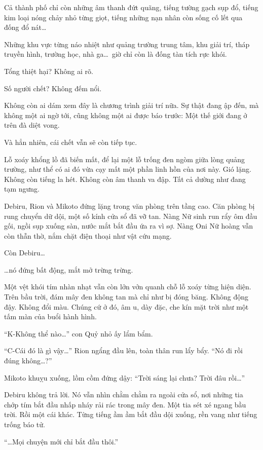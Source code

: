 \documentclass[../main.tex]{subfiles}
\begin{document}
Cả thành phố chỉ còn những âm thanh đứt quãng, tiếng tường gạch sụp đổ, tiếng kim loại nóng chảy nhỏ từng giọt, tiếng những nạn nhân còn sống cố lết qua đống đổ nát\dots

Những khu vực từng náo nhiệt như quảng trường trung tâm, khu giải trí, tháp truyền hình, trường học, nhà ga\dots\ giờ chỉ còn là đống tàn tích rực khói.

Tổng thiệt hại? Không ai rõ.

Số người chết? Không đếm nổi.

Không còn ai dám xem đây là chương trình giải trí nữa. Sự thật đang ập đến, mà không một ai ngờ tới, cũng không một ai được báo trước: Một thế giới đang ở trên đà diệt vong.

Và hẳn nhiên, cái chết vẫn sẽ còn tiếp tục.

\ct

Lỗ xoáy khổng lồ đã biến mất, để lại một lỗ trống đen ngòm giữa lòng quảng trường, như thể có ai đó vừa cạy mất một phần linh hồn của nơi này. Gió lặng. Không còn tiếng la hét. Không còn âm thanh va đập. Tất cả dường như đang tạm ngưng.

Debiru, Rion và Mikoto đứng lặng trong văn phòng trên tầng cao. Căn phòng bị rung chuyển dữ dội, một số kính cửa sổ đã vỡ tan. Nàng Nữ sinh run rẩy ôm đầu gối, ngồi sụp xuống sàn, nước mắt bắt đầu ứa ra vì sợ. Nàng Oni Nữ hoàng vẫn còn thẫn thờ, nắm chặt điện thoại như vật cứu mạng.

Còn Debiru\dots

\dots nó đứng bất động, mắt mở trừng trừng.

Một vệt khói tím nhàn nhạt vẫn còn lởn vởn quanh chỗ lỗ xoáy từng hiện diện. Trên bầu trời, đám mây đen không tan mà chỉ như bị đóng băng. Không động đậy. Không đổi màu. Chúng cứ ở đó, âm u, dày đặc, che kín mặt trời như một tấm màn của buổi hành hình.

``K-Không thể nào\dots'' con Quỷ nhỏ ấy lẩm bẩm.

``C-Cái đó là gì vậy\dots'' Rion ngẩng đầu lên, toàn thân run lẩy bẩy. ``Nó đi rồi đúng không\dots?''

Mikoto khuỵu xuống, lồm cồm đứng dậy: ``Trời sáng lại chưa? Trời đâu rồi\dots''

Debiru không trả lời. Nó vẫn nhìn chằm chằm ra ngoài cửa sổ, nơi những tia chớp tím bắt đầu nhấp nháy rải rác trong mây đen. Một tia sét xé ngang bầu trời. Rồi một cái khác. Từng tiếng ầm ầm bắt đầu dội xuống, rền vang như tiếng trống báo tử.

``\dots Mọi chuyện mới chỉ bắt đầu thôi.''
\end{document}
